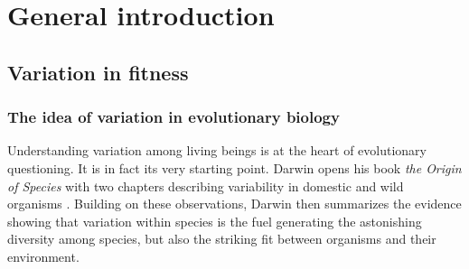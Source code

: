 
\chapter[Chapter 1: General introduction]{General introduction}

\section{Variation in fitness}
\subsection{The idea of variation in evolutionary biology}
Understanding variation among living beings is at the heart of evolutionary questioning. It is in fact its very starting point. Darwin opens his book \emph{the Origin of Species} with two chapters describing variability in domestic and wild organisms \parencite{Darwin1859}.
Building on these observations, Darwin then summarizes the evidence showing that variation within species is the fuel generating the astonishing diversity among species, but also the striking fit between organisms and their environment.

